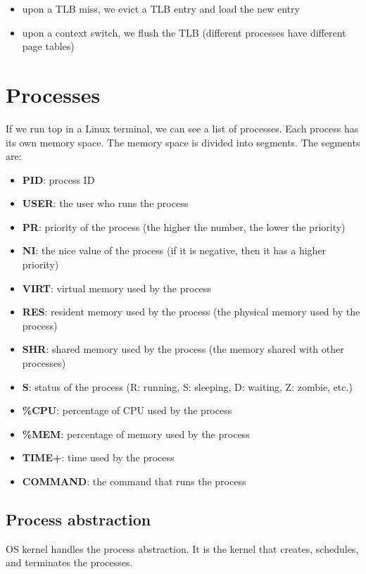 \documentclass[letterpaper,12pt]{article}
\begin{document}
\begin{itemize}
    \item upon a TLB miss, we evict a TLB entry and load the new entry
    \item upon a context switch, we flush the TLB (different processes have different
          page tables)
\end{itemize}

\section{Processes}
If we run top in a Linux terminal, we can see a list of processes. Each process
has its own memory space. The memory space is divided into segments. The
segments are: \begin{itemize}
    \item \textbf{PID}: process ID
    \item \textbf{USER}: the user who runs the process
    \item \textbf{PR}: priority of the process (the higher the number, the lower the priority)
    \item \textbf{NI}: the nice value of the process (if it is negative, then it has a higher priority)
    \item \textbf{VIRT}: virtual memory used by the process
    \item \textbf{RES}: resident memory used by the process (the physical memory used by the process)
    \item \textbf{SHR}: shared memory used by the process (the memory shared with other processes)
    \item \textbf{S}: status of the process (R: running, S: sleeping, D: waiting, Z: zombie, etc.)
    \item \textbf{\%CPU}: percentage of CPU used by the process
    \item \textbf{\%MEM}: percentage of memory used by the process
    \item \textbf{TIME+}: time used by the process
    \item \textbf{COMMAND}: the command that runs the process
\end{itemize}
\subsection{Process abstraction}
OS kernel handles the process abstraction. It is the kernel that creates,
schedules, and terminates the processes.
\end{document}
